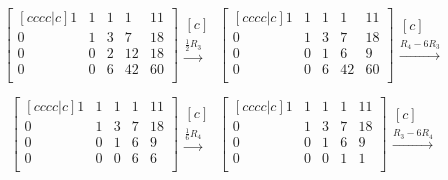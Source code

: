\begin{equation*}
\begin{bmatrix}[cccc|c]
	1 & 1 & 1 & 1 & 11 \\
	0 & 1 & 3 & 7 & 18 \\
	0 & 0 & 2 & 12 & 18 \\
	0 & 0 & 6 & 42 & 60 \\
\end{bmatrix}
\begin{matrix}[c]
	~ \\
	\xrightarrow{\frac{1}{2} R_3} \\
	~ \\
\end{matrix}
\begin{bmatrix}[cccc|c]
1 & 1 & 1 & 1 & 11 \\
0 & 1 & 3 & 7 & 18 \\
0 & 0 & 1 & 6 & 9 \\
0 & 0 & 6 & 42 & 60 \\
\end{bmatrix}
\begin{matrix}[c]
~ \\
\xrightarrow{R_4-6R_3} \\
~ \\
\end{matrix}
\end{equation*}

\begin{equation*}
\begin{bmatrix}[cccc|c]
1 & 1 & 1 & 1 & 11 \\
0 & 1 & 3 & 7 & 18 \\
0 & 0 & 1 & 6 & 9 \\
0 & 0 & 0 & 6 & 6 \\
\end{bmatrix}
\begin{matrix}[c]
~ \\
\xrightarrow{\frac{1}{6} R_4} \\
~ \\
\end{matrix}
\begin{bmatrix}[cccc|c]
1 & 1 & 1 & 1 & 11 \\
0 & 1 & 3 & 7 & 18 \\
0 & 0 & 1 & 6 & 9 \\
0 & 0 & 0 & 1 & 1 \\
\end{bmatrix}
\begin{matrix}[c]
~ \\
\xrightarrow{R_3-6R_4} \\
~ \\
\end{matrix}
\end{equation*}

